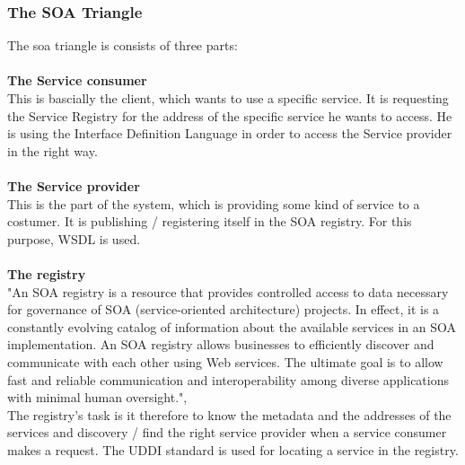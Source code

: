 \documentclass[12pt]{article}
\begin{document}
\subsubsection{The SOA Triangle}
\label{sec:soatriangle}
The \gls{soa} triangle is consists of three parts:
\\\\\textbf{The Service consumer} \\
This is bascially the client, which wants to use a specific service. It is requesting the Service Registry 	for the address of the specific service he wants to access. He is using the Interface Definition Language in order to  access the Service provider in the right way.
\\\\\textbf{The Service provider}\\ 
This is the part of the system, which is providing some kind of service to a costumer. It is publishing / registering itself in the SOA registry. For this purpose, WSDL is used.
\\\\\textbf{The registry}\\ 
"An SOA registry is a resource that provides controlled access to data necessary for governance of SOA (service-oriented architecture) projects. In effect, it is a constantly evolving catalog of information about the available services in an SOA implementation. An SOA registry allows businesses to efficiently discover and communicate with each other using Web services. The ultimate goal is to allow fast and reliable communication and interoperability among diverse applications with minimal human oversight.", \cite{soareg}\\
The registry's task is it therefore to know the metadata and the addresses of the services and discovery / find the right service provider when a service consumer makes a request.
The UDDI standard is used for locating a service in the registry.
\end{document}
